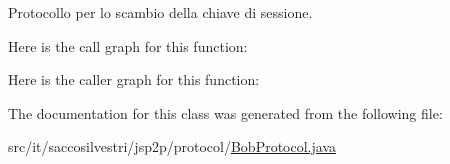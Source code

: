 \-Protocollo per lo scambio della chiave di sessione. 



\-Here is the call graph for this function\-:




\-Here is the caller graph for this function\-:




\-The documentation for this class was generated from the following file\-:\begin{DoxyCompactItemize}
\item 
src/it/saccosilvestri/jsp2p/protocol/\hyperlink{_bob_protocol_8java}{\-Bob\-Protocol.\-java}\end{DoxyCompactItemize}
